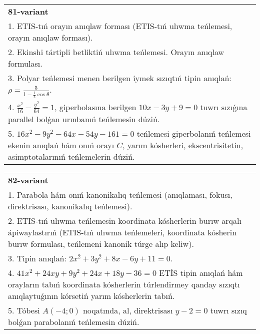 \documentclass{article}
\begin{document}
\begin{tabular}{m{17cm}}
\textbf{81-variant}\\
1. ETIS-tıń orayın anıqlaw forması (ETIS-tıń ulıwma teńlemesi, orayın anıqlaw forması).\\

2. Ekinshi tártipli betliktiń ulıwma teńlemesi. Orayın anıqlaw formulası.\\

3. Polyar teńlemesi menen berilgen iymek sızıqtıń tipin anıqlań: $\rho=\frac{5}{1-\frac{1}{2}\cos\theta}$.\\

4. $\frac{x^{2}}{16} - \frac{y^{2}}{64} = 1$, giperbolasına berilgen $10x - 3y + 9 = 0$ tuwrı sızıǵına parallel bolǵan urınbanıń teńlemesin dúziń.  \\

5. $16x^{2} - 9y^{2} - 64x - 54y - 161 = 0$ teńlemesi giperbolanıń teńlemesi ekenin anıqlań hám onıń orayı $C$, yarım kósherleri, ekscentrisitetin, asimptotalarınıń teńlemelerin dúziń.  
\end{tabular}
\vspace{1cm}


\begin{tabular}{m{17cm}}
\textbf{82-variant}\\
1. Parabola hám onıń kanonikalıq teńlemesi (anıqlaması, fokusı, direktrisası, kanonikalıq teńlemesi).\\

2. ETIS-tıń ulıwma teńlemesin koordinata kósherlerin burıw arqalı ápiwaylastırıń (ETIS-tıń ulıwma teńlemeleri, koordinata kósherin burıw formulası, teńlemeni kanonik túrge alıp keliw).\\

3. Tipin anıqlań: $2 x^{2}+3 y^{2}+8 x-6 y+11=0$.\\

4. $41x^{2} + 24xy + 9y^{2} + 24x + 18y - 36 = 0$ ETİS tipin anıqlań hám orayların tabıń koordinata kósherlerin túrlendirmey qanday sızıqtı anıqlaytuǵının kórsetiń yarım kósherlerin tabıń.  \\

5. Tóbesi $A(-4;0)$ noqatında, al, direktrisası $y - 2 = 0$ tuwrı sızıq bolǵan parabolanıń teńlemesin dúziń.
\end{tabular}
\vspace{1cm}
\end{document}

